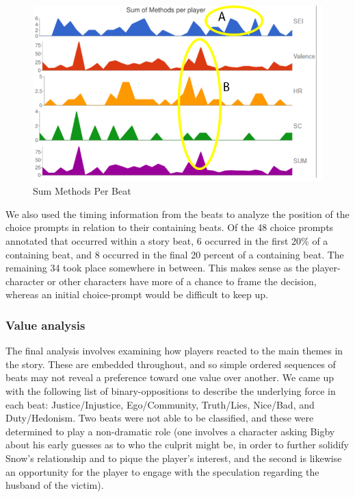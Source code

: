 \begin{figure}[htbp]
\centering
\includegraphics[width=.9\linewidth]{figures/Fig5.PNG}
\caption{\label{fig:org20a5023}
Sum Methods Per Beat}
\end{figure}


We also used the timing information from the beats to analyze the
position of the choice prompts in relation to their containing
beats. Of the 48 choice prompts annotated that occurred within a story
beat, 6 occurred in the first 20\% of a containing beat, and 8 occurred
in the final 20 percent of a containing beat. The remaining 34 took
place somewhere in between. This makes sense as the player-character
or other characters have more of a chance to frame the decision,
whereas an initial choice-prompt would be difficult to keep up.

\subsubsection{Value analysis}
\label{sec:org6109f03}

The final analysis involves examining how players reacted to the main
themes in the story. These are embedded throughout, and so simple
ordered sequences of beats may not reveal a preference toward one
value over another. We came up with the following list of
binary-oppositions to describe the underlying force in each beat:
Justice/Injustice, Ego/Community, Truth/Lies, Nice/Bad, and
Duty/Hedonism. Two beats were not able to be classified, and these
were determined to play a non-dramatic role (one involves a character
asking Bigby about his early guesses as to who the culprit might be,
in order to further solidify Snow's relationship and to pique the
player's interest, and the second is likewise an opportunity for the
player to engage with the speculation regarding the husband of the
victim).

